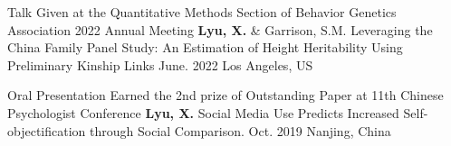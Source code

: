 \begin{cventries2}
    \cventryx
	{Talk Given at the Quantitative Methods Section of Behavior Genetics Association 2022 Annual Meeting} %
    {\textbf{Lyu, X.} \& Garrison, S.M. Leveraging the China Family Panel Study: An Estimation of Height Heritability Using Preliminary Kinship Links } 
    {June. 2022} %
    {Los Angeles, US}
    
    \cventryx
 	{Oral Presentation Earned the 2nd prize of Outstanding Paper at 11th Chinese Psychologist Conference} %
    {\textbf{Lyu, X.} Social Media Use Predicts Increased Self-objectification through Social Comparison.}
    {Oct. 2019}
    {Nanjing, China}
\end{cventries2}